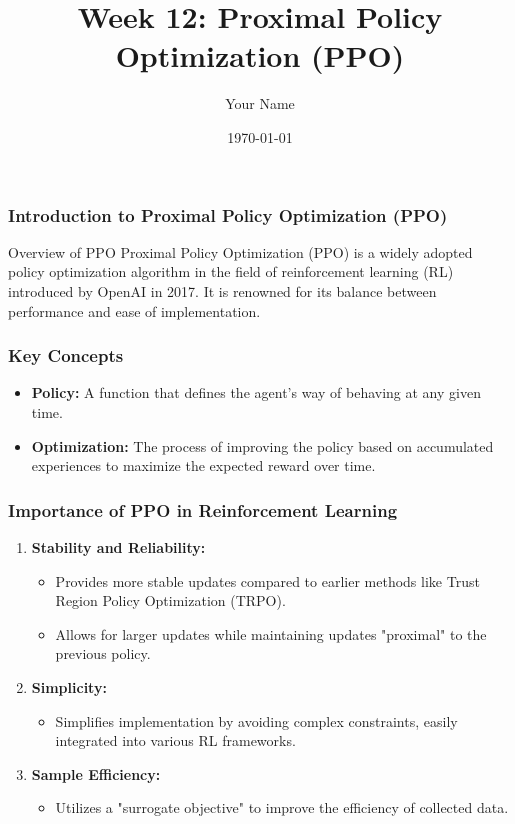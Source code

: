 \documentclass{beamer}
\title{Week 12: Proximal Policy Optimization (PPO)}
\author{Your Name}
\institute{Your Institution}
\date{\today}
\begin{document}
\frame{\titlepage}

\begin{frame}[fragile]
    \frametitle{Introduction to Proximal Policy Optimization (PPO)}
    \begin{block}{Overview of PPO}
        Proximal Policy Optimization (PPO) is a widely adopted policy optimization algorithm in the field of reinforcement learning (RL) introduced by OpenAI in 2017.
        It is renowned for its balance between performance and ease of implementation.
    \end{block}
\end{frame}

\begin{frame}[fragile]
    \frametitle{Key Concepts}
    \begin{itemize}
        \item \textbf{Policy:} A function that defines the agent's way of behaving at any given time.
        \item \textbf{Optimization:} The process of improving the policy based on accumulated experiences to maximize the expected reward over time.
    \end{itemize}
\end{frame}

\begin{frame}[fragile]
    \frametitle{Importance of PPO in Reinforcement Learning}
    \begin{enumerate}
        \item \textbf{Stability and Reliability:}
        \begin{itemize}
            \item Provides more stable updates compared to earlier methods like Trust Region Policy Optimization (TRPO).
            \item Allows for larger updates while maintaining updates "proximal" to the previous policy.
        \end{itemize}
        
        \item \textbf{Simplicity:}
        \begin{itemize}
            \item Simplifies implementation by avoiding complex constraints, easily integrated into various RL frameworks.
        \end{itemize}
        
        \item \textbf{Sample Efficiency:}
        \begin{itemize}
            \item Utilizes a "surrogate objective" to improve the efficiency of collected data.
        \end{itemize}
    \end{enumerate}
\end{frame}
\end{document}

